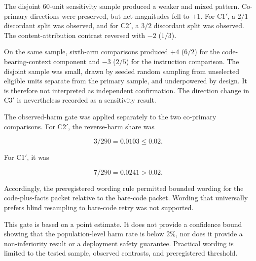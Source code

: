 \documentclass{article}
\numberwithin{equation}{section}  %
\newcommand{\fitwidth}[1]{\resizebox{\ifdim\width>\linewidth \linewidth\else\width\fi}{!}{#1}}
\theoremstyle{definition}
\newcommand{\armTC}{\textsf{TC}}
\newcommand{\armCF}{\textsf{CF-SF}}
\newcommand{\Cone}{C1$'$}
\newcommand{\Ctwo}{C2$'$}
\newcommand{\Cthree}{C3$'$}
\begin{document}
\begin{table}[t]
\centering\footnotesize
\caption{Empty-fact exposure. Round-$0$ rendered violation fact counts for the facts-only
(\armTC) and code-plus-facts (\armCF) arms across the $290$ primary units. The rendered
violation block is round-specific, derived from each round's incumbent trajectory. Per-round
SHA-$256$ equality holds across all four rounds for $250$ of $290$ units and varies for the
remaining $40$ (Round-identical column). No primary unit received zero facts at round-$0$ entry,
although a later round may render zero facts once a candidate stops violating the public tier.}
\label{tab:factexposure}
\fitwidth{}
\end{table}

The disjoint 60-unit sensitivity sample produced a weaker and mixed pattern. Co-primary
directions were preserved, but net magnitudes fell to $+1$. For \Cone{}, a $2/1$ discordant
split was observed, and for \Ctwo{}, a $3/2$ discordant split was observed. The
content-attribution contrast reversed with $-2$ ($1/3$).

On the same sample, sixth-arm comparisons produced $+4$ ($6/2$) for the code-bearing-context
component and $-3$ ($2/5$) for the instruction comparison. The disjoint sample was small,
drawn by seeded random sampling from unselected eligible units separate from the primary
sample, and underpowered by design. It is therefore not interpreted as independent
confirmation. The direction change in \Cthree{} is nevertheless recorded as a sensitivity
result.

The observed-harm gate was applied separately to the two co-primary comparisons. For \Ctwo{},
the reverse-harm share was

\[
3/290=0.0103\le0.02 .
\]

For \Cone{}, it was

\[
7/290=0.0241>0.02 .
\]

Accordingly, the preregistered wording rule permitted bounded wording for the code-plus-facts
packet relative to the bare-code packet. Wording that universally prefers blind resampling to
bare-code retry was not supported.

This gate is based on a point estimate. It does not provide a confidence bound showing that the
population-level harm rate is below $2\%$, nor does it provide a non-inferiority result or a
deployment safety guarantee. Practical wording is limited to the tested sample, observed
contrasts, and preregistered threshold.
\end{document}
